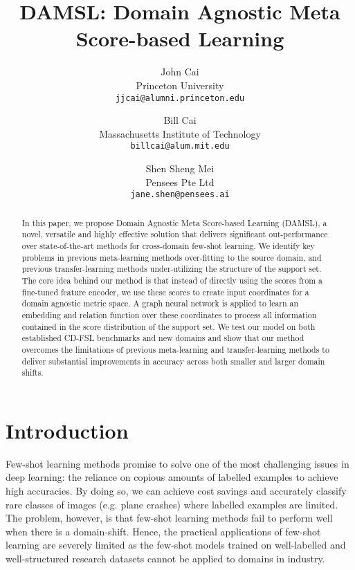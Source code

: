 \documentclass[final]{cvpr}
\begin{document}
\title{DAMSL: Domain Agnostic Meta Score-based Learning}

\author{John Cai \\
Princeton University \\
  {\tt jjcai@alumni.princeton.edu}
\and
Bill Cai \\
Massachusetts Institute of Technology \\
  {\tt billcai@alum.mit.edu} 
\and 
Shen Sheng Mei \\
Pensees Pte Ltd \\
  {\tt jane.shen@pensees.ai}
}

\maketitle

\begin{abstract}
  In this paper, we propose Domain Agnostic Meta Score-based Learning (DAMSL), a novel, versatile and highly effective solution that delivers significant out-performance over state-of-the-art methods for cross-domain few-shot learning. We identify key problems in previous meta-learning methods over-fitting to the source domain, and previous transfer-learning methods under-utilizing the structure of the support set.  The core idea behind our method is that instead of directly using the scores from a fine-tuned feature encoder, we use these scores to create input coordinates for a domain agnostic metric space. A graph neural network is applied to learn an embedding and relation function over these coordinates to process all information contained in the score distribution of the support set. We test our model on both established CD-FSL benchmarks and new domains and show that our method overcomes the limitations of previous meta-learning and transfer-learning methods to deliver substantial improvements in accuracy across both smaller and larger domain shifts.
\end{abstract}

\section{Introduction}

Few-shot learning methods promise to solve one of the most challenging issues in deep learning: the reliance on copious amounts of labelled examples to achieve high accuracies. By doing so, we can achieve cost savings and accurately classify rare classes of images (e.g. plane crashes) where labelled examples are limited. The problem, however, is that few-shot learning methods fail to perform well when there is a domain-shift. Hence, the practical applications of few-shot learning are severely limited as the few-shot models trained on well-labelled and well-structured research datasets cannot be applied to domains in industry.
\end{document}
